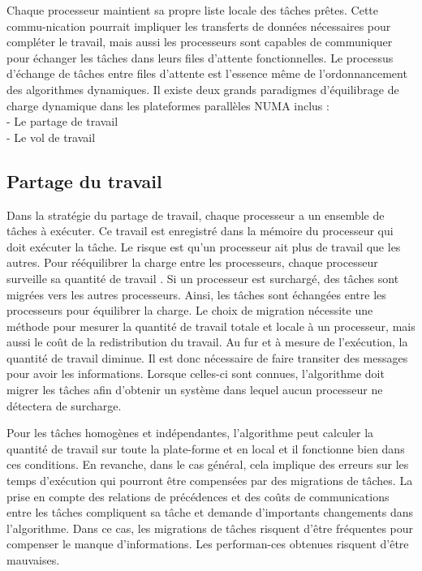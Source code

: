 Chaque processeur maintient sa propre liste locale des tâches prêtes.
Cette commu-nication pourrait impliquer les transferts de données nécessaires pour compléter le travail, 
mais aussi les processeurs sont capables de communiquer pour échanger les tâches dans leurs files d'attente fonctionnelles. 
Le processus d'échange de tâches entre files d'attente est l'essence même de l'ordonnancement des algorithmes dynamiques. \cite{quint11}
Il existe deux grands paradigmes d'équilibrage de charge dynamique dans les plateformes parallèles NUMA inclus : \\
- Le partage de travail \cite{BL99}\\
- Le vol de travail \cite{BLU95}\\
%
\subsection{Partage du travail} 
Dans la stratégie du partage de travail, chaque processeur a un ensemble de tâches à exécuter. 
Ce travail est enregistré dans la mémoire du processeur qui doit exécuter la tâche. 
Le risque est qu’un processeur ait plus de travail que les autres. 
Pour rééquilibrer la charge entre les processeurs, chaque processeur surveille sa quantité de travail . 
Si un processeur est surchargé, des tâches sont migrées vers les autres processeurs. 
Ainsi, les tâches sont échangées entre les processeurs pour équilibrer la charge.
Le choix de migration nécessite une méthode pour mesurer la quantité de travail totale et locale à un processeur, mais aussi le coût de la redistribution du travail. 
Au fur et à mesure de l’exécution, la quantité de travail diminue. 
Il est donc nécessaire de faire transiter des messages pour avoir les informations. 
Lorsque celles-ci sont connues, l’algorithme doit migrer les tâches afin d’obtenir un système dans lequel aucun processeur ne détectera de surcharge. \cite{quint11}

Pour les tâches homogènes et indépendantes, l’algorithme peut calculer la quantité de travail
sur toute la plate-forme et en local et il fonctionne bien dans ces conditions. 
En revanche, dans le cas général, cela implique des erreurs sur les temps d’exécution qui pourront être compensées par des migrations de tâches.
La prise en compte des relations de précédences et des coûts de communications entre les tâches compliquent sa tâche et demande d’importants changements dans l’algorithme. 
Dans ce cas, les migrations de tâches risquent d’être fréquentes pour compenser le manque d’informations.
Les performan-ces obtenues risquent d’être mauvaises. \cite{quint11}
%
